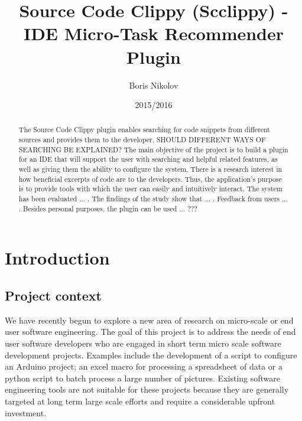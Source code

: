 \documentclass{l4proj}
\begin{document}
\title{Source Code Clippy (Scclippy) - IDE Micro-Task Recommender Plugin}
\author{Boris Nikolov}
\date{2015/2016}
\maketitle

\begin{abstract}
The Source Code Clippy plugin enables searching for code snippets from different sources and provides them to the developer. 
SHOULD DIFFERENT WAYS OF SEARCHING BE EXPLAINED?
The main objective of the project is to build a plugin for an IDE that will support the user with searching and helpful related features, as well as giving them the ability to configure the system. There is a research interest in how beneficial excerpts of code are to the developers. Thus, the application's purpose is to provide tools with which the user can easily and intuitively interact. 
The system has been evaluated ... . The findings of the study show that ... . Feedback from users ... . Besides personal purposes, the plugin can be used ... ???
\end{abstract}

\educationalconsent
%
%
\tableofcontents

\chapter{Introduction}

\section{Project context}

We have recently begun to explore a new area of research on micro-scale or end user software engineering. The goal of this project is to address the needs of end user software developers who are engaged in short term micro scale software development projects. Examples include the development of a script to configure an Arduino project; an excel macro for processing a spreadsheet of data or a python script to batch process a large number of pictures. Existing software engineering tools are not suitable for these projects because they are generally targeted at long term large scale efforts and require a considerable upfront investment. 
\end{document}
